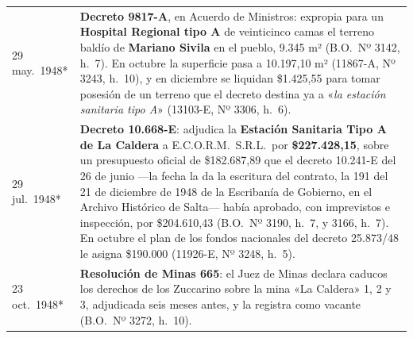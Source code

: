 \begin{longtable}{@{}p{2.7cm}p{10.3cm}@{}}
29 may.\ 1948* & \textbf{Decreto 9817-A}, en Acuerdo de Ministros: expropia para un \textbf{Hospital Regional tipo A} de veinticinco camas el terreno baldío de \textbf{Mariano Sivila} en el pueblo, 9.345 m² (B.O.\ Nº 3142, h.\ 7). En octubre la superficie pasa a 10.197,10 m² (11867-A, Nº 3243, h.\ 10), y en diciembre se liquidan \$1.425,55 para tomar posesión de un terreno que el decreto destina ya a «\textit{la estación sanitaria tipo A}» (13103-E, Nº 3306, h.\ 6). \\
29 jul.\ 1948* & \textbf{Decreto 10.668-E}: adjudica la \textbf{Estación Sanitaria Tipo A de La Caldera} a E.C.O.R.M.\ S.R.L.\ por \textbf{\$227.428,15}, sobre un presupuesto oficial de \$182.687,89 que el decreto 10.241-E del 26 de junio ---la fecha la da la escritura del contrato, la 191 del 21 de diciembre de 1948 de la Escribanía de Gobierno, en el Archivo Histórico de Salta--- había aprobado, con imprevistos e inspección, por \$204.610,43 (B.O.\ Nº 3190, h.\ 7, y 3166, h.\ 7). En octubre el plan de los fondos nacionales del decreto 25.873/48 le asigna \$190.000 (11926-E, Nº 3248, h.\ 5). \\
23 oct.\ 1948* & \textbf{Resolución de Minas 665}: el Juez de Minas declara caducos los derechos de los Zuccarino sobre la mina «La Caldera» 1, 2 y 3, adjudicada seis meses antes, y la registra como vacante (B.O.\ Nº 3272, h.\ 10). \\

\end{longtable}
